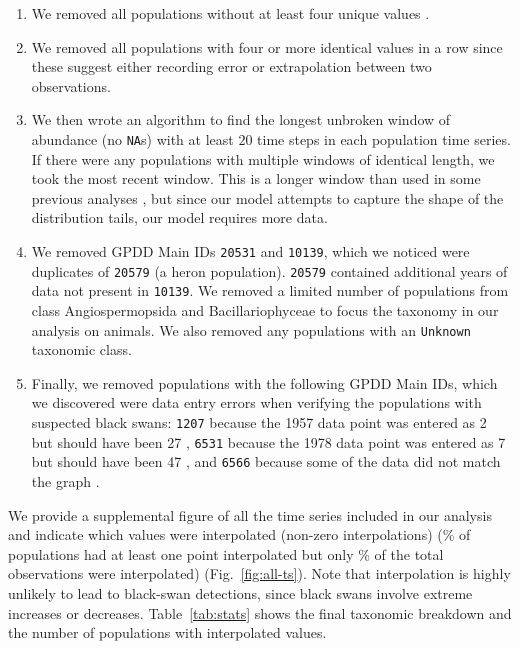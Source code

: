 \begin{enumerate}
\item We removed all populations without at least four unique values
  \citep[following][]{brook2006a}.

\item We removed all populations with four or more identical values in a row
  since these suggest either recording error or extrapolation between two
  observations.

\item We then wrote an algorithm to find the longest unbroken window of
  abundance (no \texttt{NA}s) with at least $20$ time steps in each population
  time series. If there were any populations with multiple windows of identical
  length, we took the most recent window. This is a longer window than used in
  some previous analyses \citep[e.g.][]{brook2006a}, but since our model
  attempts to capture the shape of the distribution tails, our model requires
  more data.

\item We removed GPDD Main IDs \texttt{20531} and \texttt{10139}, which we
  noticed were duplicates of \texttt{20579} (a heron population).
  \texttt{20579} contained additional years of data not present in
  \texttt{10139}. We removed a limited number of populations from class
  Angiospermopsida and Bacillariophyceae to focus the taxonomy in our analysis
  on animals. We also removed any populations with an \texttt{Unknown}
  taxonomic class.

\item Finally, we removed populations with the following GPDD Main IDs, which
  we discovered were data entry errors when verifying the populations with
  suspected black swans: \texttt{1207} because the 1957 data point was entered
  as 2 but should have been 27 \citep{kendeigh1982}, \texttt{6531} because the
  1978 data point was entered as 7 but should have been 47 \citep{minot1986},
  and \texttt{6566} because some of the data did not match the graph
  \citep{heessen1996}.

\end{enumerate}

\noindent
We provide a supplemental figure of all the time series included in our
analysis and indicate which values were interpolated (non-zero interpolations)
(\percImputedPops\% of populations had at least one point interpolated but
only \percImputedPoints\% of the total observations were interpolated)
(Fig.~\ref{fig:all-ts}). Note that interpolation is highly unlikely to lead to
black-swan detections, since black swans involve extreme increases or
decreases. Table~\ref{tab:stats} shows the final taxonomic breakdown and the
number of populations with interpolated values.

